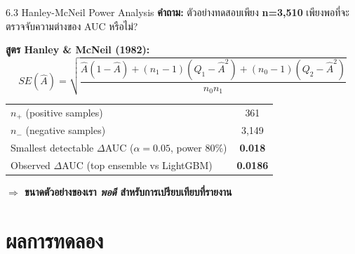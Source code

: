 \documentclass[aspectratio=169,11pt,xcolor=dvipsnames]{beamer}
\newcommand{\hl}[1]{\textcolor{kmitlOrange}{\textbf{#1}}}
\begin{document}
\begin{frame}{6.3 Hanley-McNeil Power Analysis}
  \textbf{คำถาม:} ตัวอย่างทดสอบเพียง \hl{n=3{,}510} เพียงพอที่จะตรวจจับความต่างของ AUC หรือไม่?
  \vspace{0.4em}

  \textbf{สูตร Hanley \& McNeil (1982):}
  \[
    SE(\hat{A}) = \sqrt{\frac{\hat{A}(1-\hat{A}) + (n_1-1)(Q_1-\hat{A}^2) + (n_0-1)(Q_2-\hat{A}^2)}{n_0 n_1}}
  \]
  \vspace{0.2em}
  \begin{center}
    \begin{tabular}{lc}
      \toprule
      $n_+$ (positive samples) & 361 \\
      $n_-$ (negative samples) & 3{,}149 \\
      Smallest detectable $\Delta$AUC ($\alpha=0.05$, power 80\%) & \hl{0.018} \\
      Observed $\Delta$AUC (top ensemble vs LightGBM) & \hl{0.0186} \\
      \bottomrule
    \end{tabular}
  \end{center}
  \vspace{0.4em}
  \begin{center}
    \hl{$\Rightarrow$ ขนาดตัวอย่างของเรา \emph{พอดี} สำหรับการเปรียบเทียบที่รายงาน}
  \end{center}
\end{frame}

\section{ผลการทดลอง}
\end{document}
